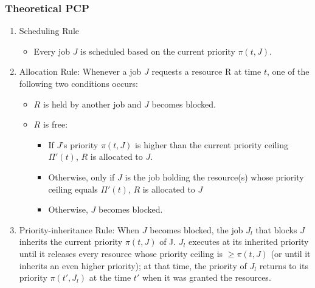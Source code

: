 \documentclass[t]{beamer}
\begin{document}
\begin{frame}
  \frametitle{Theoretical PCP}
  \footnotesize
  \begin{enumerate}\small
  \item Scheduling Rule
    \begin{itemize}
    \item Every job $J$ is scheduled based on the
      current priority $\pi(t, J)$.
    \end{itemize}
  \item Allocation Rule: Whenever a job $J$ requests a resource R at
    time $t$, one of the following two conditions occurs:
    \begin{itemize}
    \item $R$ is held by another job and $J$ becomes blocked.
    \item $R$ is free:
      \begin{itemize}
      \item If $J$'s priority $\pi(t, J)$ is higher than the current
        priority ceiling $\Pi'(t)$, $R$ is allocated to $J$.
      \item Otherwise, only if $J$ is the job holding the resource(s)
        whose priority ceiling equals $\Pi'(t)$, $R$ is allocated to
        $J$
      \item Otherwise, $J$ becomes blocked.
      \end{itemize}
    \end{itemize}
  \item Priority-inheritance Rule: When $J$ becomes blocked, the job
    $J_l$ that blocks $J$ inherits the current priority $\pi(t, J)$ of J.
    $J_l$ executes at its inherited priority until it releases every
    resource whose priority ceiling is $\geq \pi(t, J)$ (or until it
    inherits an even higher priority); at that time, the priority of
    $J_l$ returns to its priority $\pi(t', J_l)$ at the time $t'$ when it was
    granted the resources.
  \end{enumerate}
\end{frame}
\end{document}
